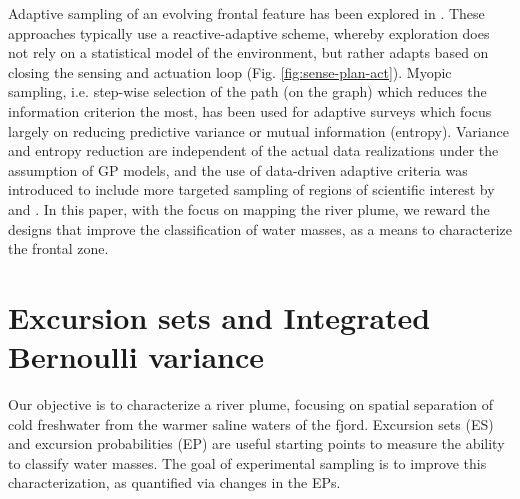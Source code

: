 \documentclass[aoas]{imsart}
\begin{document}
Adaptive sampling of an evolving frontal feature has been explored in
\cite{fronts11,Zhang2012,Pinto2018,costa19}. These approaches
typically use a reactive-adaptive scheme, whereby exploration does not
rely on a statistical model of the environment, but rather adapts
based on closing the sensing and actuation loop
(Fig. \ref{fig:sense-plan-act}). Myopic sampling, i.e. step-wise
selection of the path (on the graph) which reduces the information
criterion the most, has been used for adaptive surveys
\citep{singh2009efficient,Binney2013} which focus largely on reducing
predictive variance or mutual information (entropy). Variance and
entropy reduction are independent of the actual data realizations
under the assumption of GP models, and the use of data-driven adaptive
criteria was introduced to include more targeted sampling of regions
of scientific interest by \cite{Low2009} and \cite{fossuminformation}.
In this paper, with the focus on mapping the river plume, we reward
the designs that improve the classification of water masses, as a
means to characterize the frontal zone.







\section{Excursion sets and Integrated Bernoulli variance}
\label{sec:ESEP}

Our objective is to characterize a river plume, focusing on spatial
separation of cold freshwater from the warmer saline waters of the
fjord. Excursion sets (ES) and excursion probabilities (EP) are useful
starting points to measure the ability to classify water masses. The
goal of experimental sampling is to improve this characterization, as
quantified via changes in the EPs.
\end{document}
